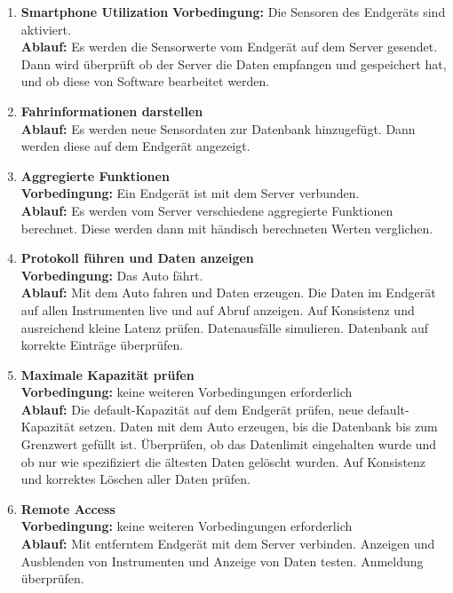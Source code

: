 \documentclass[pflichtenheft.tex]{subfiles}
\begin{document}
\begin{enumerate}
\item{\textbf{Smartphone Utilization}}
\textbf{Vorbedingung: } Die Sensoren des Endgeräts sind aktiviert. \\
\textbf{Ablauf: } Es werden die Sensorwerte vom Endgerät auf dem Server gesendet. Dann wird überprüft ob der Server die Daten empfangen und gespeichert hat, und ob diese von Software bearbeitet werden.

\item{\textbf{Fahrinformationen darstellen}} \\
\textbf{Ablauf: } Es werden neue Sensordaten zur Datenbank hinzugefügt. Dann werden diese auf dem Endgerät angezeigt.

\item{\textbf{Aggregierte Funktionen}} \\
\textbf{Vorbedingung: } Ein Endgerät ist mit dem Server verbunden. \\ 
\textbf{Ablauf: } Es werden vom Server verschiedene aggregierte Funktionen berechnet. Diese werden dann mit händisch berechneten Werten verglichen.

\item{\textbf{Protokoll führen und Daten anzeigen}} \\
\textbf{Vorbedingung: } Das Auto fährt. \\
\textbf{Ablauf: } Mit dem Auto fahren und Daten erzeugen. Die Daten im Endgerät auf allen Instrumenten live und auf Abruf anzeigen. Auf Konsistenz und ausreichend kleine Latenz prüfen. Datenausfälle simulieren. Datenbank auf korrekte Einträge überprüfen.

\item{\textbf{Maximale Kapazität prüfen}} \\
\textbf{Vorbedingung: } keine weiteren Vorbedingungen erforderlich \\
\textbf{Ablauf: } Die default-Kapazität auf dem Endgerät prüfen, neue default-Kapazität setzen. Daten mit dem Auto erzeugen, bis die Datenbank bis zum Grenzwert gefüllt ist. Überprüfen, ob das Datenlimit eingehalten wurde und ob nur wie spezifiziert die ältesten Daten gelöscht wurden. Auf Konsistenz und korrektes Löschen aller Daten prüfen.

\item{\textbf{Remote Access}} \\
\textbf{Vorbedingung: } keine weiteren Vorbedingungen erforderlich \\
\textbf{Ablauf: } Mit entferntem Endgerät mit dem Server verbinden. Anzeigen und Ausblenden von Instrumenten und Anzeige von Daten testen. Anmeldung überprüfen.


\end{enumerate}
\end{document}
